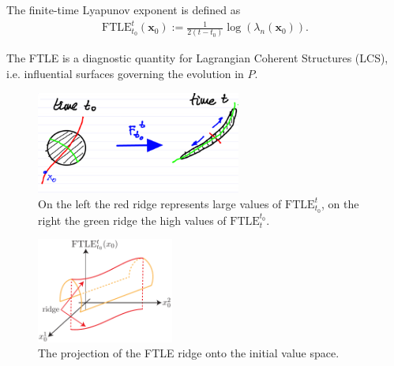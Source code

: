 \begin{definition}
	The finite-time Lyapunov exponent is defined as
	\begin{align}
		\boxed{ \textrm{FTLE} _{t_0}^{t}( \textbf{x}_0) := \frac{1}{2(t-t_0)} \log(\lambda_n( \textbf{x}_0)).}
	\end{align}
\end{definition}
The FTLE is a diagnostic quantity for Lagrangian Coherent Structures (LCS), i.e. influential surfaces governing the evolution in $P$.
\begin{figure}[h!]
	\centering
	\includegraphics[width=0.6\textwidth]{figures/ch1/9deformation.png}
	\caption{On the left the red ridge represents large values of $ \textrm{FTLE} _{t_0}^{t}$, on the right the green ridge the high values of $ \textrm{FTLE} _{t}^{t_0}$.}
	\label{fig:FTLE_ridges}
\end{figure}
\begin{figure}[h!]
	\centering
	\includegraphics[width=0.4\textwidth]{figures/ch1/10ridge_projection}
	\caption{The projection of the FTLE ridge onto the initial value space.}
	\label{fig:FTLE_surface}
\end{figure}

